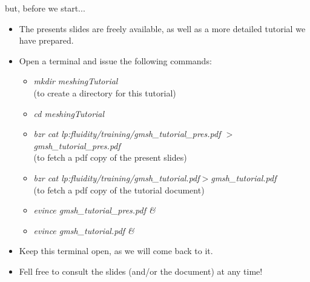 \documentclass[t]{beamer}
\begin{document}
\begin{frame}{but, before we start...}
  \begin{itemize}
     \item The presents slides are freely available, as well as a more detailed tutorial we have prepared.\\
     \item Open a terminal and issue the following commands:\\[10pt]
     \begin{itemize}
        \item[] \hspace{-60pt}\emph{mkdir meshingTutorial} \\(to create a directory for this tutorial)\\
        \item[] \hspace{-60pt}\emph{cd meshingTutorial}\\
        \item[] \hspace{-60pt}\emph{bzr cat lp:fluidity/training/gmsh\_tutorial\_pres.pdf $>$ gmsh\_tutorial\_pres.pdf}\\ (to fetch a pdf copy of the present slides)\\
        \item[] \hspace{-60pt}\emph{bzr cat lp:fluidity/training/gmsh\_tutorial.pdf$>$gmsh\_tutorial.pdf}\\ (to fetch a pdf copy of the tutorial document)
        \item[] \hspace{-60pt}\emph{evince gmsh\_tutorial\_pres.pdf \&}
        \item[] \hspace{-60pt}\emph{evince gmsh\_tutorial.pdf \&}\\[10pt]
     \end{itemize}
     \item Keep this terminal open, as we will come back to it.\\
     \item Fell free to consult the slides (and/or the document) at any time!
  \end{itemize}
\end{frame}
\end{document}
